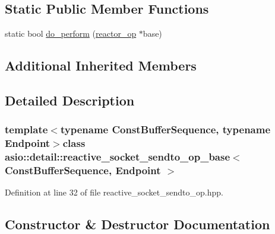 \subsection*{Static Public Member Functions}
\begin{DoxyCompactItemize}
\item 
static bool \hyperlink{classasio_1_1detail_1_1reactive__socket__sendto__op__base_aa316d45bd01b2b2c4b17931ca760ef35}{do\+\_\+perform} (\hyperlink{classasio_1_1detail_1_1reactor__op}{reactor\+\_\+op} $\ast$base)
\end{DoxyCompactItemize}
\subsection*{Additional Inherited Members}


\subsection{Detailed Description}
\subsubsection*{template$<$typename Const\+Buffer\+Sequence, typename Endpoint$>$class asio\+::detail\+::reactive\+\_\+socket\+\_\+sendto\+\_\+op\+\_\+base$<$ Const\+Buffer\+Sequence, Endpoint $>$}



Definition at line 32 of file reactive\+\_\+socket\+\_\+sendto\+\_\+op.\+hpp.



\subsection{Constructor \& Destructor Documentation}
\hypertarget{classasio_1_1detail_1_1reactive__socket__sendto__op__base_ae077d3ce1544e50a7036702e4b9896d1}{}
